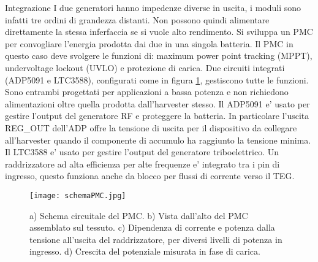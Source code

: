 \begin{section}{Integrazione}
    {\color{red}I due generatori hanno impedenze diverse in uscita, i moduli sono infatti tre ordini di grandezza distanti. Non possono quindi alimentare direttamente la stessa inferfaccia se si vuole alto rendimento}. Si sviluppa un PMC per convogliare l'energia prodotta dai due in una singola batteria. Il PMC in questo caso deve svolgere le funzioni di: maximum power point tracking (MPPT), undervoltage lockout (UVLO) e protezione di carica. Due circuiti integrati (ADP5091 e LTC3588), configurati come in figura \ref{fig:schemaPMC}, gestiscono tutte le funzioni. Sono entrambi progettati per applicazioni a bassa potenza e non richiedono alimentazioni oltre quella prodotta dall'harvester stesso. Il ADP5091 e' usato per gestire l'output del generatore RF e proteggere la batteria. In particolare l'uscita REG\_OUT dell'ADP offre la tensione di uscita per il dispositivo da collegare all'harvester quando il componente di accumulo ha raggiunto la tensione minima. Il LTC3588 e' usato per gestire l'output del generatore triboelettrico. Un raddrizzatore ad alta efficienza per alte frequenze e' integrato  tra i pin di ingresso, questo funziona anche da blocco per flussi di corrente verso il TEG.

    \begin{figure}[hbt!]
        \texttt{[image: schemaPMC.jpg]}
        \centering
        \caption{a) Schema circuitale del PMC. b) Vista dall'alto del PMC assemblato sul tessuto. c) Dipendenza di corrente e potenza dalla tensione all'uscita del raddrizzatore, per diversi livelli di potenza in ingresso. d) Crescita del potenziale misurata in fase di carica.\cite{kouWearableAllFabricHybrid2024}}
        \label{fig:schemaPMC}
    \end{figure}


\end{section}
